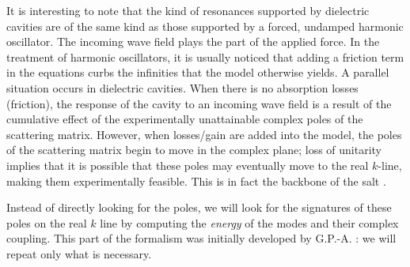 It is interesting to note that the kind of resonances supported
by dielectric cavities are of the same kind as those supported
by a forced, undamped harmonic oscillator. The incoming wave field
plays the part of the applied force. In the treatment of 
harmonic oscillators, it is usually noticed that adding a friction 
term in the equations curbs the infinities that the model otherwise 
yields. A parallel situation occurs in dielectric cavities. When there
is no absorption losses (friction), the response of the cavity 
to an incoming wave field is a result of the cumulative effect 
of the experimentally unattainable complex poles of the scattering matrix. 
However, when losses/gain are added into the model, the poles of the scattering
matrix begin to move in the complex plane; loss of unitarity implies that
it is possible that these poles may eventually move to the real $k$-line, 
making them experimentally feasible. This is in fact the backbone 
of the \gls{salt} \cite{GE2010a,GE2010b}.

Instead of directly looking for the poles, we will look for the signatures
of these poles on the real $k$ line by computing the \textit{energy}
of the modes and their complex coupling. This part of the formalism
was initially developed by G.P.-A. \cite{GAP2013a}: we will repeat
only what is necessary. 

